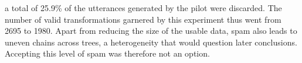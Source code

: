 \documentclass[a4paper,fleqn]{cas-dc}
\begin{document}
a total of 25.9\% of the utterances generated by the pilot were discarded.
The number of valid transformations garnered by this experiment thus
went from 2695 to 1980. Apart from reducing the size of the usable data,
spam also leads to uneven chains across trees, a heterogeneity that
would question later conclusions. Accepting this level of spam was therefore not
an option.
\end{document}
